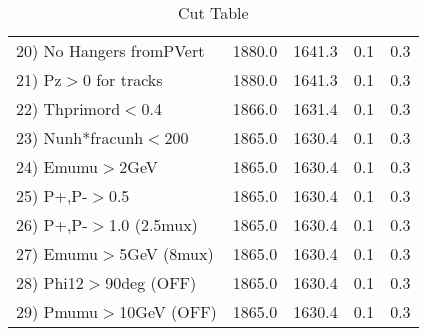 \begin{table}[h!]
\begin{tabular}{||l||r|r|r|r||}
 20) No Hangers fromPVert &      1880.0 &      1641.3 &         0.1 &         0.3 \\
 21) Pz$>$0 for tracks    &      1880.0 &      1641.3 &         0.1 &         0.3 \\
 22) Thprimord$<$0.4      &      1866.0 &      1631.4 &         0.1 &         0.3 \\
 23) Nunh*fracunh$<$200   &      1865.0 &      1630.4 &         0.1 &         0.3 \\
 24) Emumu$>$2GeV         &      1865.0 &      1630.4 &         0.1 &         0.3 \\
 25) P+,P-$>$0.5          &      1865.0 &      1630.4 &         0.1 &         0.3 \\
 26) P+,P-$>$1.0 (2.5mux) &      1865.0 &      1630.4 &         0.1 &         0.3 \\
 27) Emumu$>$5GeV  (8mux) &      1865.0 &      1630.4 &         0.1 &         0.3 \\
 28) Phi12$>$90deg  (OFF) &      1865.0 &      1630.4 &         0.1 &         0.3 \\
 29) Pmumu$>$10GeV  (OFF) &      1865.0 &      1630.4 &         0.1 &         0.3 \\
 \hline
 \hline
 \end{tabular}
 \caption{Cut Table \cohjp  }
 \label{tab-cut__jpsi}
 \end{table}
